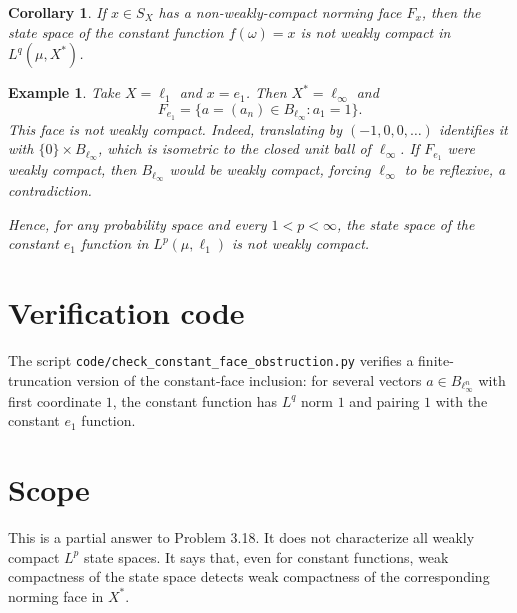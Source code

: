 \documentclass[11pt]{article}
\newtheorem{corollary}{Corollary}
\newtheorem{example}{Example}
\begin{document}
\begin{corollary}
If $x\in S_X$ has a non-weakly-compact norming face $F_x$, then the state
space of the constant function $f(\omega)=x$ is not weakly compact in
$L^q(\mu,X^*)$.
\end{corollary}

\begin{example}
Take $X=\ell_1$ and $x=e_1$. Then $X^*=\ell_\infty$ and
\[
F_{e_1}=\{a=(a_n)\in B_{\ell_\infty}:a_1=1\}.
\]
This face is not weakly compact. Indeed, translating by $(-1,0,0,\ldots)$
identifies it with $\{0\}\times B_{\ell_\infty}$, which is isometric to the
closed unit ball of $\ell_\infty$. If $F_{e_1}$ were weakly compact, then
$B_{\ell_\infty}$ would be weakly compact, forcing $\ell_\infty$ to be
reflexive, a contradiction.

Hence, for any probability space and every $1<p<\infty$, the state space of
the constant $e_1$ function in $L^p(\mu,\ell_1)$ is not weakly compact.
\end{example}

\section*{Verification code}

The script \texttt{code/check\_constant\_face\_obstruction.py} verifies a
finite-truncation version of the constant-face inclusion: for several vectors
$a\in B_{\ell_\infty^n}$ with first coordinate $1$, the constant function has
$L^q$ norm $1$ and pairing $1$ with the constant $e_1$ function.

\section*{Scope}

This is a partial answer to Problem 3.18. It does not characterize all weakly
compact $L^p$ state spaces. It says that, even for constant functions, weak
compactness of the state space detects weak compactness of the corresponding
norming face in $X^*$.
\end{document}
